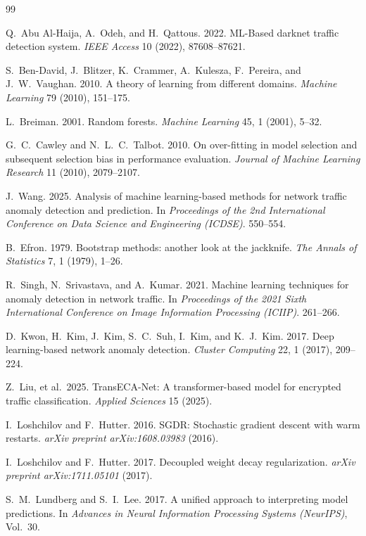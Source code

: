 \documentclass[sigconf]{acmart}
\begin{document}
\begin{thebibliography}{99}

Q.\ Abu Al-Haija, A.\ Odeh, and H.\ Qattous. 2022. ML-Based darknet traffic detection system. \textit{IEEE Access} 10 (2022), 87608--87621.

S.\ Ben-David, J.\ Blitzer, K.\ Crammer, A.\ Kulesza, F.\ Pereira, and J.\ W.\ Vaughan. 2010. A theory of learning from different domains. \textit{Machine Learning} 79 (2010), 151--175.

L.\ Breiman. 2001. Random forests. \textit{Machine Learning} 45, 1 (2001), 5--32.

G.\ C.\ Cawley and N.\ L.\ C.\ Talbot. 2010. On over-fitting in model selection and subsequent selection bias in performance evaluation. \textit{Journal of Machine Learning Research} 11 (2010), 2079--2107.

J.\ Wang. 2025. Analysis of machine learning-based methods for network traffic anomaly detection and prediction. In \textit{Proceedings of the 2nd International Conference on Data Science and Engineering (ICDSE)}. 550--554.

B.\ Efron. 1979. Bootstrap methods: another look at the jackknife. \textit{The Annals of Statistics} 7, 1 (1979), 1--26.

R.\ Singh, N.\ Srivastava, and A.\ Kumar. 2021. Machine learning techniques for anomaly detection in network traffic. In \textit{Proceedings of the 2021 Sixth International Conference on Image Information Processing (ICIIP)}. 261--266.

D.\ Kwon, H.\ Kim, J.\ Kim, S.\ C.\ Suh, I.\ Kim, and K.\ J.\ Kim. 2017. Deep learning-based network anomaly detection. \textit{Cluster Computing} 22, 1 (2017), 209--224.

Z.\ Liu, et al.\ 2025. TransECA-Net: A transformer-based model for encrypted traffic classification. \textit{Applied Sciences} 15 (2025).

I.\ Loshchilov and F.\ Hutter. 2016. SGDR: Stochastic gradient descent with warm restarts. \textit{arXiv preprint arXiv:1608.03983} (2016).

I.\ Loshchilov and F.\ Hutter. 2017. Decoupled weight decay regularization. \textit{arXiv preprint arXiv:1711.05101} (2017).

S.\ M.\ Lundberg and S.\ I.\ Lee. 2017. A unified approach to interpreting model predictions. In \textit{Advances in Neural Information Processing Systems (NeurIPS)}, Vol.\ 30.


\end{thebibliography}
\end{document}
